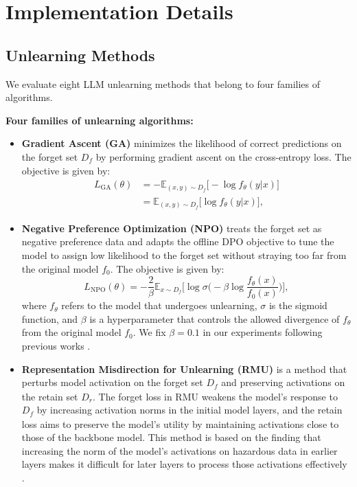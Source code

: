 \section{Implementation Details}


\subsection{Unlearning Methods}
\label{appendix: unlearning methods}
We evaluate eight LLM unlearning methods that belong to four families of algorithms.

\noindent\textbf{Four families of unlearning algorithms:}
\begin{itemize}[nolistsep, leftmargin=*]
        \item \textbf{Gradient Ascent (GA)} \citep{thudi2022unrolling} minimizes the likelihood of correct predictions on the forget set \( D_{\mathit{f}} \) by performing gradient ascent on the cross-entropy loss. The objective is given by:
        \begin{align*}
        L_{\text{GA}}(\theta) &= - \mathbb{E}_{(x, y) \sim D_{\mathit{f}}} 
        \Big[ -\log f_\theta(y|x) \Big] \\
        &= \mathbb{E}_{(x, y) \sim D_{\mathit{f}}} 
        \Big[ \log f_\theta(y|x) \Big],
        \end{align*}

        \item \textbf{Negative Preference Optimization (NPO)} \citep{zhang2024negative} treats the forget set as negative preference data and adapts the offline DPO \citep{rafailov2024direct} objective to tune the model to assign low likelihood to the forget set without straying too far from the original model \( f_0 \). The objective is given by:
        \[
        L_{\text{NPO}}(\theta) = - \frac{2}{\beta} \mathbb{E}_{x \sim D_{\mathit{f}}} 
        \Big[ \log \sigma \big( -\beta \log \frac{f_\theta(x)}{f_0(x)} \big) \Big],
        \]
        where \( f_\theta \) refers to the model that undergoes unlearning, \( \sigma \) is the sigmoid function, and \( \beta \) is a hyperparameter that controls the allowed divergence of \( f_\theta \) from the original model \( f_0 \). We fix \( \beta = 0.1 \) in our experiments following previous works \citep{shi2024muse,zhang2024negative}.
    
       
        \item \textbf{Representation Misdirection for Unlearning (RMU)} \citep{li2024wmdp} is a method that perturbs model activation on the forget set \( D_{\mathit{f}} \) and preserving activations on the retain set \( D_{\mathit{r}} \). The forget loss in RMU weakens the model’s response to  \( D_{\mathit{f}} \) by increasing activation norms in the initial model layers, and the retain loss aims to preserve the model's utility by maintaining activations close to those of the backbone model. This method is based on the finding that increasing the norm of the model’s activations on hazardous data in earlier layers makes it difficult for later layers to process those activations effectively \citep{li2024wmdp}. 
    

\end{itemize}
